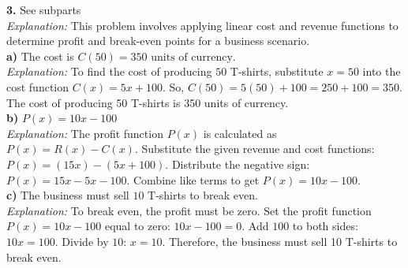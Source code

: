 \documentclass[12pt,a4paper]{article}
\begin{document}
\vspace{4pt}
\begin{answerbox}
\noindent\textbf{3.} See subparts
\\ \noindent\textit{Explanation:} This problem involves applying linear cost and revenue functions to determine profit and break-even points for a business scenario.
\\\textbf{a)} The cost is $C(50) = 350 \text{ units of currency}$.\\\textit{Explanation:} To find the cost of producing $50$ T-shirts, substitute $x=50$ into the cost function $C(x) = 5x + 100$. So, $C(50) = 5(50) + 100 = 250 + 100 = 350$. The cost of producing 50 T-shirts is 350 units of currency.
\\\textbf{b)} $P(x) = 10x - 100$\\\textit{Explanation:} The profit function $P(x)$ is calculated as $P(x) = R(x) - C(x)$. Substitute the given revenue and cost functions: $P(x) = (15x) - (5x + 100)$. Distribute the negative sign: $P(x) = 15x - 5x - 100$. Combine like terms to get $P(x) = 10x - 100$.
\\\textbf{c)} The business must sell $10$ T-shirts to break even.\\\textit{Explanation:} To break even, the profit must be zero. Set the profit function $P(x) = 10x - 100$ equal to zero: $10x - 100 = 0$. Add $100$ to both sides: $10x = 100$. Divide by $10$: $x = 10$. Therefore, the business must sell 10 T-shirts to break even.
\end{answerbox}
\vspace{4pt}
\end{document}
